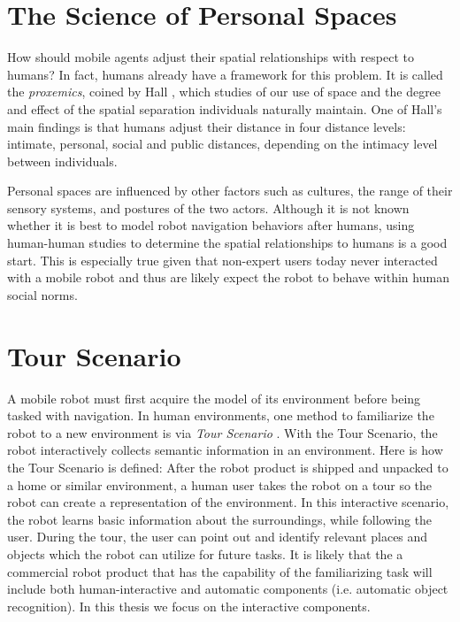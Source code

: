 \section{The Science of Personal Spaces}
\label{sec:personal_spaces}

How should mobile agents adjust their spatial relationships with respect to humans? In fact, humans already have a framework for this problem. It is called the \textit{proxemics}, coined by Hall \cite{hall1966hidden}, which studies of our use of space and the degree and effect of the spatial separation individuals naturally maintain. One of Hall's main findings is that humans adjust their distance in four distance levels: intimate, personal, social and public distances, depending on the intimacy level between individuals.

Personal spaces are influenced by other factors such as cultures, the range of their sensory systems, and postures of the two actors. Although it is not known whether it is best to model robot navigation behaviors after humans, using human-human studies to determine the spatial relationships to humans is a good start. This is especially true given that non-expert users today never interacted with a mobile robot and thus are likely expect the robot to behave within human social norms.

\section{Tour Scenario}
\label{sec:tour_scenario}

A mobile robot must first acquire the model of its environment before being tasked with navigation. In human environments, one method to familiarize the robot to a new environment is via \textit{Tour Scenario} \cite{topp2008human}. With the Tour Scenario, the robot interactively collects semantic information in an environment. Here is how the Tour Scenario is defined: After the robot product is shipped and unpacked to a home or similar environment, a human user takes the robot on a tour so the robot can create a representation of the environment. In this interactive scenario, the robot learns basic information about the surroundings, while following the user. During the tour, the user can point out and identify relevant places and objects which the robot can utilize for future tasks. It is likely that the a commercial robot product that has the capability of the familiarizing task will include both human-interactive and automatic components (i.e. automatic object recognition). In this thesis we focus on the interactive components.


